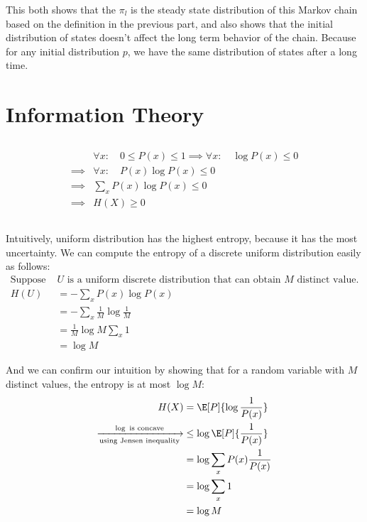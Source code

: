 \documentclass{article}
\begin{document}
This both shows that the \(\pi_l\) is the steady state distribution of this Markov chain based on the definition in the previous part, and also shows that the initial distribution of states doesn't affect the long term behavior of the chain.
Because for any initial distribution \(p\), we have the same distribution of states after a long time.


\section{Information Theory}
\subsection{}
\begin{align*}
&\forall x: \quad 0\le P(x) \le 1 \implies \forall x: \quad \log P(x) \le 0\\
\implies &\forall x: \quad P(x) \log P(x) \le 0\\
\implies &\sum_{x} P(x) \log P(x) \le 0\\
\implies & H(X) \ge 0
\end{align*}

\subsection{}
\label{sec:3b}
Intuitively, uniform distribution has the highest entropy, because it has the most uncertainty.
We can compute the entropy of a discrete uniform distribution easily as follows:
\begin{align*}
\text{Suppose } & U \text{ is a uniform discrete distribution that can obtain } M \text{ distinct value.}\\
H(U) &= -\sum_{x} P(x) \log P(x)\\
&= - \sum_{x} \frac{1}{M} \log \frac{1}{M}\\
&= \frac{1}{M} \log M \sum_{x} 1\\
&= \log M
\end{align*}

And we can confirm our intuition by showing that for a random variable with \(M\) distinct values, the entropy is at most \(\log M\):
\begin{align*}
H(X) &= \E[P]{\log \frac{1}{P(x)}}\\
\xrightarrow[\text{using Jensen inequality}]{\log \text{ is concave}} & \le \log \E[P]{\frac{1}{P(x)}}\\
&= \log \sum_{x} P(x) \frac{1}{P(x)}\\
&= \log \sum_{x} 1\\
&= \log M
\end{align*}
\end{document}
